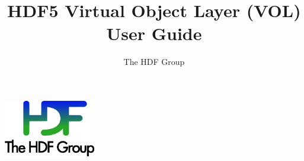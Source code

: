 \documentclass[10pt,a4paper]{article}
\begin{document}
\title{HDF5 Virtual Object Layer (VOL)\\
    User Guide}

\author{The HDF Group}

\maketitle
\thispagestyle{empty}

\vfill
\begin{center}
\includegraphics[width=4cm]{THG_LOGO.pdf} %
\end{center}
\vfill
\vfill


\newpage
{}
\tableofcontents
\newpage






\end{document}

